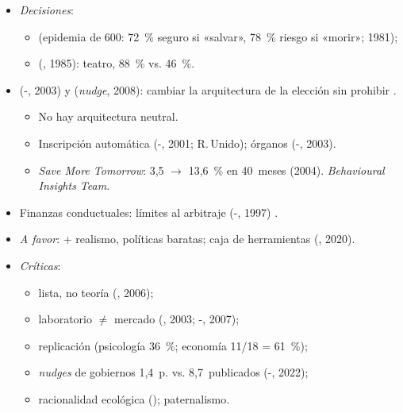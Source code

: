 \documentclass{article}
\begin{document}
\begin{columnas}
\begin{itemize}
\begin{itemize}
  \end{itemize}
\item \emph{Decisiones}:
  \begin{itemize}
  \item {} (epidemia de 600: 72~\% seguro si «salvar», 78~\% riesgo si «morir»; 1981);
  \item {} (, 1985): teatro, 88~\% vs. 46~\%.
  \end{itemize}
\end{itemize}
\begin{itemize}
\item {} (-, 2003) y  (\emph{nudge}, 2008): cambiar la arquitectura de la elección sin prohibir .
  \begin{itemize}
  \item No hay arquitectura neutral.
  \item Inscripción automática (-, 2001; R.\,Unido); órganos (-, 2003).
  \item \emph{Save More Tomorrow}: 3,5 $\to$ 13,6~\% en 40~meses (2004). \emph{Behavioural Insights Team}.
  \end{itemize}
\item Finanzas conductuales: límites al arbitraje (-, 1997) .
\end{itemize}
\begin{itemize}
\item \emph{A favor}: + realismo, políticas baratas; caja de herramientas (, 2020).
\item \emph{Críticas}:
  \begin{itemize}
  \item lista, no teoría (, 2006);
  \item laboratorio $\neq$ mercado (, 2003; -, 2007);
  \item replicación (psicología 36~\%; economía 11/18 = 61~\%);
  \item \emph{nudges} de gobiernos 1,4~p. vs. 8,7~publicados (-, 2022);
  \item racionalidad ecológica (); paternalismo.
  \end{itemize}
\end{itemize}


\end{columnas}
\end{document}
